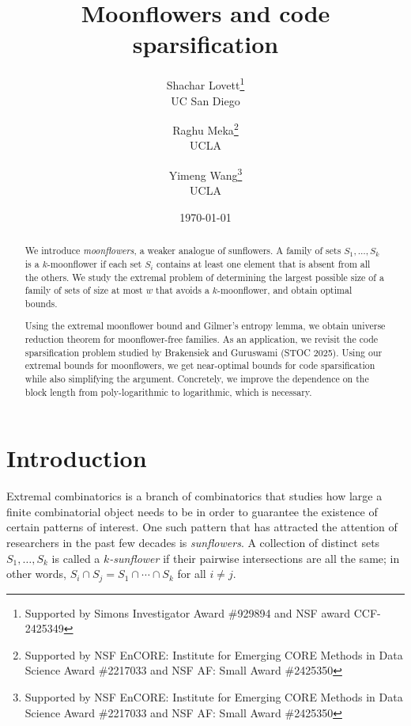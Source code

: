 \documentclass{article}
\newcommand{\<}{\langle}
\renewcommand{\>}{\rangle}
\begin{document}
\title{Moonflowers and code sparsification}

\author{Shachar Lovett\thanks{Supported by Simons Investigator Award \#929894 and NSF award CCF-2425349} \\
UC San Diego \and Raghu Meka\thanks{Supported by NSF EnCORE: Institute for Emerging CORE Methods in Data Science Award \#2217033 and NSF AF: Small Award \#2425350} \\ UCLA \and Yimeng Wang\thanks{Supported by NSF EnCORE: Institute for Emerging CORE Methods in Data Science Award \#2217033 and NSF AF: Small Award \#2425350} \\ UCLA}
\date{\today}


\maketitle

\begin{abstract}
We introduce \emph{moonflowers}, a weaker analogue of sunflowers. A family of sets $S_1,\ldots,S_k$ is a $k$-moonflower if each set $S_i$ contains at least one element that is absent from all the others. 
We study the extremal problem of determining the largest possible size of a family of sets of size at most $w$ that avoids a $k$-moonflower, and obtain optimal bounds.

Using the extremal moonflower bound and Gilmer's entropy lemma, we obtain universe reduction theorem for moonflower-free families. As an application, we revisit the code sparsification problem studied by Brakensiek and Guruswami (STOC 2025). Using our extremal bounds for moonflowers, we get near-optimal bounds for code sparsification while also simplifying the argument. Concretely, we improve the dependence on the block length from poly-logarithmic to logarithmic, which is necessary.
\end{abstract}

\section{Introduction}
Extremal combinatorics is a branch of combinatorics that studies how large a finite combinatorial object needs to be in order to guarantee the existence of certain patterns of interest. One such pattern that has attracted the attention of researchers in the past few decades is \emph{sunflowers}. 
A collection of distinct sets $S_1,\ldots,S_k$ is called a \emph{$k$-sunflower} if their pairwise intersections are all the same; in other words, $S_i \cap S_j = S_1 \cap \cdots \cap S_k$ for all $i \neq j$. 
\end{document}
